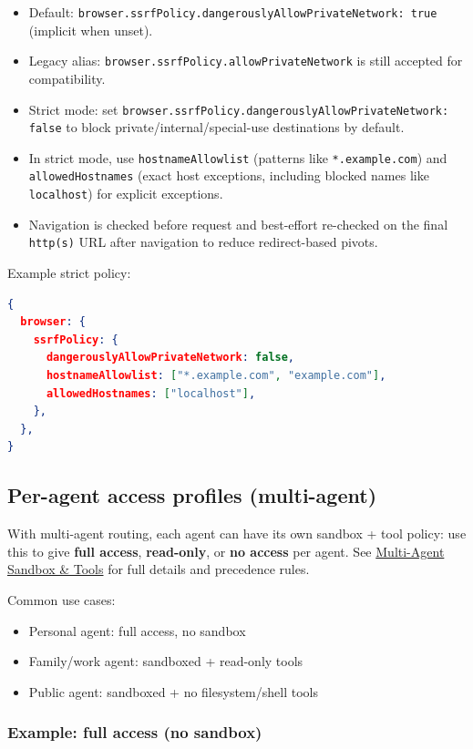\begin{itemize}
  \item Default: \texttt{browser.ssrfPolicy.dangerouslyAllowPrivateNetwork: true} (implicit when unset).
  \item Legacy alias: \texttt{browser.ssrfPolicy.allowPrivateNetwork} is still accepted for compatibility.
  \item Strict mode: set \texttt{browser.ssrfPolicy.dangerouslyAllowPrivateNetwork: false} to block private/internal/special-use destinations by default.
  \item In strict mode, use \texttt{hostnameAllowlist} (patterns like \texttt{*.example.com}) and \texttt{allowedHostnames} (exact host exceptions, including blocked names like \texttt{localhost}) for explicit exceptions.
  \item Navigation is checked before request and best-effort re-checked on the final \texttt{http(s)} URL after navigation to reduce redirect-based pivots.
\end{itemize}


Example strict policy:

\begin{lstlisting}[language=json]
{
  browser: {
    ssrfPolicy: {
      dangerouslyAllowPrivateNetwork: false,
      hostnameAllowlist: ["*.example.com", "example.com"],
      allowedHostnames: ["localhost"],
    },
  },
}
\end{lstlisting}


\subsection{Per-agent access profiles (multi-agent)}


With multi-agent routing, each agent can have its own sandbox + tool policy:
use this to give \textbf{full access}, \textbf{read-only}, or \textbf{no access} per agent.
See \href{/tools/multi-agent-sandbox-tools}{Multi-Agent Sandbox \& Tools} for full details
and precedence rules.

Common use cases:

\begin{itemize}
  \item Personal agent: full access, no sandbox
  \item Family/work agent: sandboxed + read-only tools
  \item Public agent: sandboxed + no filesystem/shell tools
\end{itemize}


\subsubsection{Example: full access (no sandbox)}


